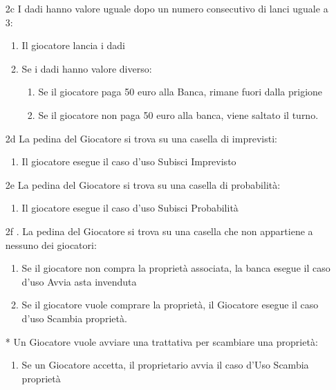\documentclass{article}
\begin{document}
\begin{enumerate}
    \item [2c] I dadi hanno valore uguale dopo un numero consecutivo di lanci uguale a 3:
    \begin{enumerate}
        \item Il giocatore lancia i dadi
        \item Se i dadi hanno valore diverso:
        \begin{enumerate}
            \item Se il giocatore paga 50 euro alla Banca, rimane fuori dalla prigione
            \item Se il giocatore non paga 50 euro alla banca, viene saltato il turno.
        \end{enumerate}
    \end{enumerate}
    \item [2d] La pedina del Giocatore si trova su una casella di imprevisti:
    \begin{enumerate}
        \item Il giocatore esegue il caso d'uso Subisci Imprevisto
    \end{enumerate}
    \item [2e] La pedina del Giocatore si trova su una casella di probabilità:
    \begin{enumerate}
        \item Il giocatore esegue il caso d'uso Subisci Probabilità
    \end{enumerate}
    \item [2f]. La pedina del Giocatore si trova su una casella che non appartiene a nessuno dei giocatori:
    \begin{enumerate}
        \item Se il giocatore non compra la proprietà associata, la banca esegue il caso d'uso Avvia asta invenduta
        \item Se il giocatore vuole comprare la proprietà, il Giocatore esegue il caso d'uso Scambia proprietà.
    \end{enumerate}
    \item [*] Un Giocatore vuole avviare una trattativa per scambiare una proprietà:
    \begin{enumerate}
        \item Se un Giocatore accetta, il proprietario avvia il caso d'Uso Scambia proprietà 
    \end{enumerate}
\end{enumerate}
\end{document}
